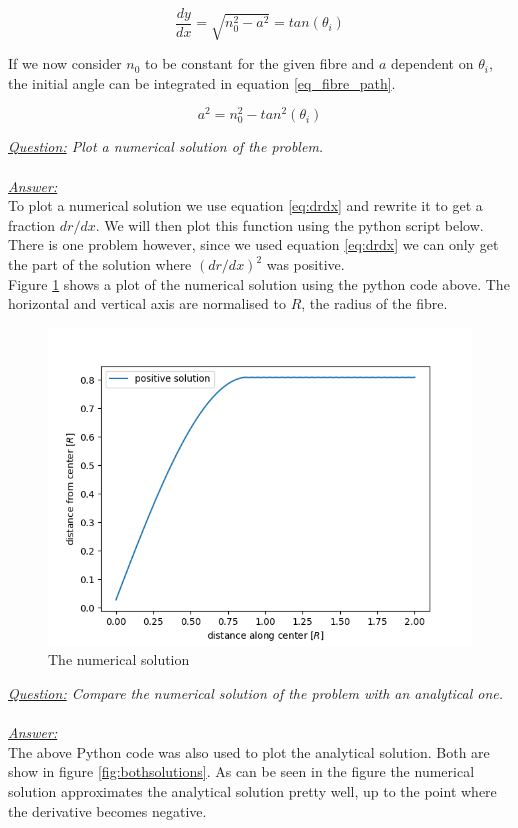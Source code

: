 \documentclass{article}
\begin{document}
\begin{equation*}
	\frac{dy}{dx} =  \sqrt{n_0^2-a^2} = tan (\theta _i)
\end{equation*}

If we now consider $n_0$ to be constant for the given fibre and $a$ dependent on $\theta _i$, the initial angle can be integrated in equation \ref{eq_fibre_path}.

\begin{equation}
	a ^2 = n_0 ^2 - tan ^2 (\theta _i)
\end{equation}

\textit{\underline{Question:} Plot a numerical solution of the problem.}\\
\\
\textit{\underline{Answer:}} \\
To plot a numerical solution we use equation \ref{eq:drdx} and rewrite it to get a fraction $dr/dx$. We will then plot this function using the python script below. There is one problem however, since we used equation  \ref{eq:drdx} we can only get the part of the solution where $(dr/dx)^2$ was positive.\\


Figure \ref{fig:numersolut} shows a plot of the numerical solution using the python code above. The horizontal and vertical axis are normalised to $R$, the radius of the fibre.\\

\begin{figure}[h!]
	\centering
	\includegraphics[width=0.55\linewidth,keepaspectratio]{afbeeldingen/numerical_solution.png}
	\caption{The numerical solution}
	\label{fig:numersolut}
\end{figure}
\textit{\underline{Question:} Compare the numerical solution of the problem with an analytical one.}\\
\\
\textit{\underline{Answer:}} \\
The above Python code was also used to plot the analytical solution. Both are show in figure \ref{fig:bothsolutions}. As can be seen in the figure the numerical solution approximates the analytical solution pretty well, up to the point where the derivative becomes negative.\\
\end{document}
